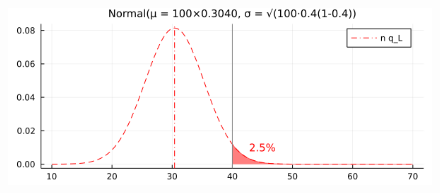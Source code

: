 \documentclass[
  letterpaper,
  DIV=11,
  numbers=noendperiod]{scrartcl}
\begin{document}
\begin{figure}[H]

{\centering \includegraphics{05 Central limit theorem_files/figure-pdf/cell-55-output-1.png}

}

\end{figure}
\end{document}
